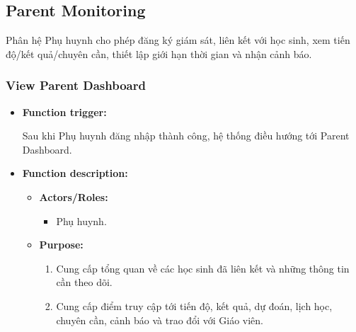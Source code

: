 \documentclass[12pt,a4paper,oneside]{report}
\begin{document}
\subsection{Parent Monitoring}
\label{subsec:parent-monitoring}

Phân hệ Phụ huynh cho phép đăng ký giám sát, liên kết với học sinh, xem tiến độ/kết quả/chuyên cần, thiết lập giới hạn thời gian và nhận cảnh báo.

\subsubsection{View Parent Dashboard}
\label{subsubsec:view-parent-dashboard}

\begin{itemize}

    \item \textbf{Function trigger:}

    Sau khi Phụ huynh đăng nhập thành công, hệ thống điều hướng tới Parent Dashboard.

    \item \textbf{Function description:}

    \begin{itemize}

        \item \textbf{Actors/Roles:}
        \begin{itemize}
            \item Phụ huynh.
        \end{itemize}

        \item \textbf{Purpose:}
        \begin{enumerate}
            \item Cung cấp tổng quan về các học sinh đã liên kết và những thông tin cần theo dõi.
            \item Cung cấp điểm truy cập tới tiến độ, kết quả, dự đoán, lịch học, chuyên cần, cảnh báo và trao đổi với Giáo viên.
        \end{enumerate}


\end{itemize}
\end{itemize}
\end{document}
